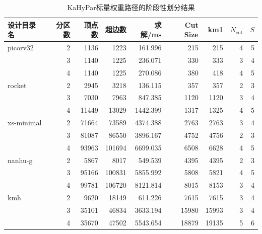 \begin{table}[htbp]
    \centering
    \caption{KaHyPar标量权重路径的阶段性划分结果}
    \label{tab:midterm-partition-results}
    \scriptsize
    \setlength{\tabcolsep}{3pt}
    \begin{tabular}{@{}lrrrrrrrr@{}}
        \toprule
        设计目录名      & 分区数 & 顶点数   & 超边数    & 求解/ms    & Cut Size & km1   & $N_{\mathrm{cut}}$ & $S$ \\
        \midrule
        picorv32   & 2   & 1136  & 1223   & 161.996  & 215      & 215   & 4                  & 5   \\
                   & 3   & 1140  & 1225   & 236.071  & 330      & 333   & 3                  & 4   \\
                   & 4   & 1140  & 1225   & 270.086  & 380      & 418   & 4                  & 5   \\
        rocket     & 2   & 2945  & 3218   & 136.115  & 357      & 357   & 2                  & 3   \\
                   & 3   & 7030  & 7963   & 847.385  & 1120     & 1120  & 3                  & 4   \\
                   & 4   & 11449 & 13029  & 1442.399 & 1317     & 1325  & 4                  & 5   \\
        xs-minimal & 2   & 71664 & 73589  & 4374.388 & 2763     & 2763  & 3                  & 4   \\
                   & 3   & 81087 & 86550  & 3896.167 & 4752     & 4756  & 2                  & 3   \\
                   & 4   & 93963 & 101694 & 6699.035 & 6508     & 6628  & 4                  & 5   \\
        nanhu-g    & 2   & 5867  & 8017   & 549.539  & 4395     & 4395  & 2                  & 3   \\
                   & 3   & 95166 & 100831 & 5855.992 & 5808     & 5821  & 4                  & 5   \\
                   & 4   & 99781 & 106720 & 8121.814 & 8015     & 8153  & 3                  & 4   \\
        kmh        & 2   & 9620  & 18149  & 611.226  & 7615     & 7615  & 3                  & 4   \\
                   & 3   & 35101 & 46834  & 3633.194 & 15980    & 15993 & 3                  & 4   \\
                   & 4   & 35670 & 47502  & 5543.654 & 18879    & 19135 & 5                  & 6   \\
        \bottomrule
    \end{tabular}
\end{table}

